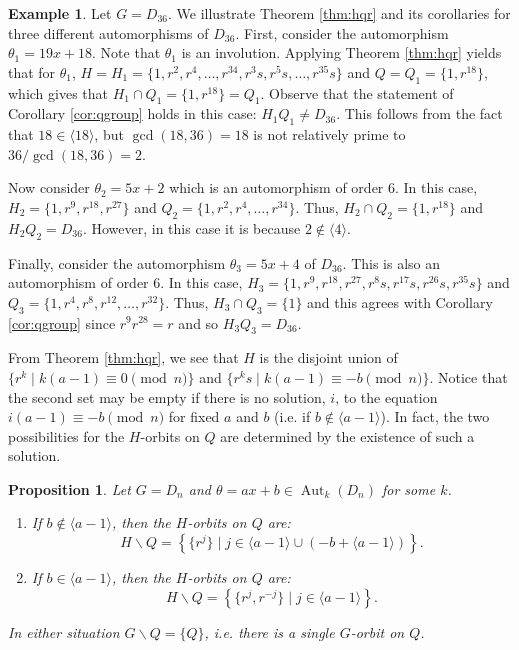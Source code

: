 \documentclass[12pt]{amsart}
\numberwithin{equation}{section}
\newtheorem{prop}[theorem]{Proposition}
\theoremstyle{definition}
\newtheorem{example}[theorem]{Example}
\newcommand{\Aut}{\operatorname{Aut}}
\begin{document}
\begin{example} \label{autexamples} Let $G=D_{36}$. We illustrate Theorem \ref{thm:hqr} and its corollaries for three different 
automorphisms of $D_{36}$. First, consider the automorphism $\theta_1=19x+18$.  Note that $\theta_1$ is an involution. Applying 
Theorem \ref{thm:hqr} yields that for $\theta_1$, $H=H_1=\{1,r^2,r^4,\ldots,r^{34}, r^3s,r^5s,\ldots, r^{35}s\}$ and $Q=Q_1=\{1,r^
{18}\}$, which gives that $H_1\cap Q_1=\{1,r^{18}\}=Q_1$. Observe that the statement of Corollary \ref{cor:qgroup} holds in this 
case: $H_1 Q_1\neq D_{36}$. This follows from the fact that $18\in\langle 18\rangle$, but $\gcd(18,36)=18$ is not relatively prime to 
$36/\gcd(18,36)=2$.  

Now consider $\theta_2=5x+2$ which is an automorphism of order 6. In this case, $H_2=\{1,r^9,r^{18},r^{27}\}$ and $Q_2=
\{1,r^2,r^4,\ldots,r^{34}\}$. Thus, $H_2\cap Q_2=\{1, r^{18}\}$ and $H_2 Q_2=D_{36}$.  However, in this case it is because $2\not\in
\langle 4\rangle$.  

Finally, consider the automorphism $\theta_3 = 5x + 4$ of $D_{36}$. This is also an automorphism of order 6. In this case, $H_3 = 
\{1, r^9, r^{18}, r^{27},  r^8s, r^{17}s, r^{26}s, r^{35}s\}$ and $Q_3 = \{1, r^4, r^8, r^{12}, \ldots , r^{32}\}$. Thus, $H_3 \cap 
Q_3 = \{1\}$ and this agrees with Corollary \ref{cor:qgroup} since $r^9r^{28} = r$ and so $H_3 Q_3 = D_{36}$.  
\end{example}

From Theorem \ref{thm:hqr}, we see that $H$ is the disjoint union of $\{r^k\mid k(a-1)\equiv 0 \pmod{n}\}$ and $\{r^ks\mid k
(a-1)\equiv -b\pmod{n}\}$. Notice that the second set may be empty if there is no solution, $i$, to the equation $i(a-1)\equiv -b
\pmod{n}$ for fixed $a$ and $b$ (i.e. if $b\not\in\langle a-1\rangle$). In fact, the two possibilities for the $H$-orbits on $Q$ are 
determined by the existence of such a solution.

\begin{prop} \label{orbits}
Let $G=D_n$ and $\theta=ax+b\in\Aut_k(D_n)$ for some $k$. 
\begin{enumerate}
\item
If $b\not\in\langle a-1\rangle$, then the $H$-orbits on $Q$ are:
$$H\backslash Q=\left\{\{r^j\}\mid j\in \langle a-1\rangle\cup(-b+\langle a-1\rangle)\right\}.$$
\item
If $b\in\langle a-1\rangle$, then the $H$-orbits on $Q$ are:
$$H\backslash Q=\left\{\{r^j, r^{-j}\}\mid j\in \langle a-1\rangle\right\}.$$
\end{enumerate}
In either situation $G\backslash Q=\{Q\}$, i.e. there is a single $G$-orbit on $Q$. 
\end{prop}
\end{document}
